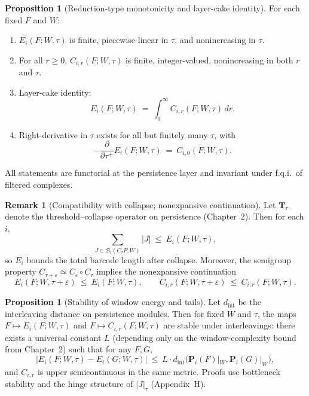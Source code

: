 \documentclass[11pt]{article}
\numberwithin{equation}{section}
\theoremstyle{plain}
\theoremstyle{definition}
\theoremstyle{remark}
\theoremstyle{plain}
\theoremstyle{definition}
\numberwithin{equation}{section}
\newtheorem{proposition}[theorem]{Proposition}
\theoremstyle{definition}
\newtheorem{remark}[theorem]{Remark}
\numberwithin{equation}{section}
\theoremstyle{plain}
\theoremstyle{definition}
\theoremstyle{remark}
\begin{document}
\begin{proposition}[Reduction-type monotonicity and layer-cake identity]\label{prop:energy-basic}
For each fixed \(F\) and \(W\):
\begin{enumerate}
\item \(E_i(F;W,\tau)\) is finite, piecewise-linear in \(\tau\), and nonincreasing in \(\tau\).
\item For all \(r\ge 0\), \(C_{i,r}(F;W,\tau)\) is finite, integer-valued, nonincreasing in both \(r\) and \(\tau\).
\item Layer-cake identity:
\[
E_i(F;W,\tau)\ =\ \int_0^{\infty} C_{i,r}(F;W,\tau)\,dr.
\]
\item Right-derivative in \(\tau\) exists for all but finitely many \(\tau\), with
\[
-\frac{\partial}{\partial\tau^+}E_i(F;W,\tau)\ =\ C_{i,0}(F;W,\tau).
\]
\end{enumerate}
All statements are functorial at the persistence layer and invariant under f.q.i.\ of filtered complexes.
\end{proposition}

\begin{remark}[Compatibility with collapse; nonexpansive continuation]
Let \(\mathbf{T}_\tau\) denote the threshold–collapse operator on persistence (Chapter~2).
Then for each \(i\),
\[
\sum_{J\in \mathcal{B}_i(C_\tau F;W)} |J|\ \le\ E_i(F;W,\tau),
\]
so \(E_i\) bounds the total barcode length after collapse. Moreover, the semigroup property \(C_{\tau+\varepsilon}\simeq C_\varepsilon\circ C_\tau\) implies the nonexpansive continuation
\[
E_i(F;W,\tau+\varepsilon)\ \le\ E_i(F;W,\tau),\qquad C_{i,r}(F;W,\tau+\varepsilon)\ \le\ C_{i,r}(F;W,\tau).
\]
\end{remark}

\begin{proposition}[Stability of window energy and tails]\label{prop:energy-stability}
Let \(d_{\mathrm{int}}\) be the interleaving distance on persistence modules.
Then for fixed \(W\) and \(\tau\), the maps \(F\mapsto E_i(F;W,\tau)\) and \(F\mapsto C_{i,r}(F;W,\tau)\) are stable under interleavings:
there exists a universal constant \(L\) (depending only on the window-complexity bound from Chapter~2) such that for any \(F,G\),
\[
\bigl|E_i(F;W,\tau)-E_i(G;W,\tau)\bigr|\ \le\ L\cdot d_{\mathrm{int}}\!\bigl(\mathbf{P}_i(F)|_W,\mathbf{P}_i(G)|_W\bigr),
\]
and \(C_{i,r}\) is upper semicontinuous in the same metric.
Proofs use bottleneck stability and the hinge structure of \(|J|_\tau\) (Appendix~H).
\end{proposition}
\end{document}

